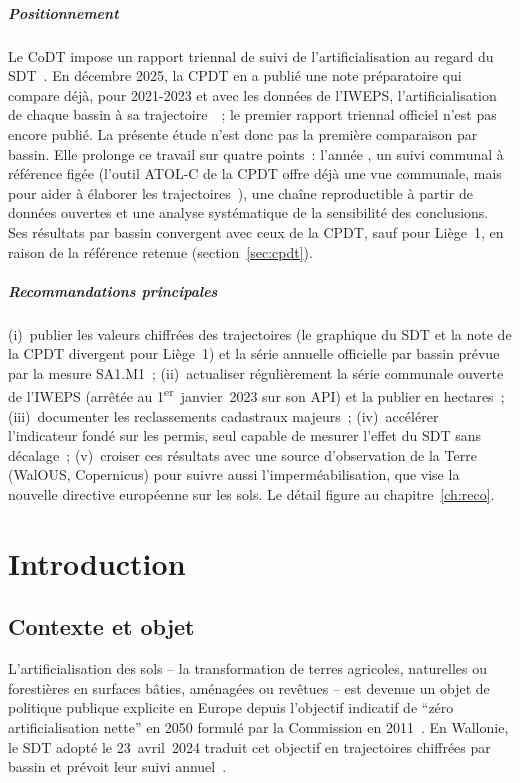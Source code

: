 \documentclass[11pt,a4paper]{report}
\begin{document}
\paragraph{Positionnement} Le CoDT impose un rapport triennal de suivi de l'artificialisation au regard du SDT~\citep{codt}. En décembre 2025, la CPDT en a publié une note préparatoire qui compare déjà, pour 2021-2023 et avec les données de l'IWEPS, l'artificialisation de chaque bassin à sa trajectoire~\citep{cpdt_prep2025,cpdt_monitoring2025}~; le premier rapport triennal officiel n'est pas encore publié. La présente étude n'est donc pas la première comparaison par bassin. Elle prolonge ce travail sur quatre points~: l'année \AnneeFinObs, un suivi communal à référence figée (l'outil ATOL-C de la CPDT offre déjà une vue communale, mais pour aider à élaborer les trajectoires~\citep{atolc2025}), une chaîne reproductible à partir de données ouvertes et une analyse systématique de la sensibilité des conclusions. Ses résultats par bassin convergent avec ceux de la CPDT, sauf pour Liège~1, en raison de la référence retenue (section~\ref{sec:cpdt}).

\paragraph{Recommandations principales} (i)~publier les valeurs chiffrées des trajectoires (le graphique du SDT et la note de la CPDT divergent pour Liège~1) et la série annuelle officielle par bassin prévue par la mesure SA1.M1~; (ii)~actualiser régulièrement la série communale ouverte de l'IWEPS (arrêtée au 1\textsuperscript{er}~janvier~2023 sur son API) et la publier en hectares~; (iii)~documenter les reclassements cadastraux majeurs~; (iv)~accélérer l'indicateur fondé sur les permis, seul capable de mesurer l'effet du SDT sans décalage~; (v)~croiser ces résultats avec une source d'observation de la Terre (WalOUS, Copernicus) pour suivre aussi l'imperméabilisation, que vise la nouvelle directive européenne sur les sols. Le détail figure au chapitre~\ref{ch:reco}.

\chapter{Introduction}
\label{ch:intro}

\section{Contexte et objet}
L'artificialisation des sols -- la transformation de terres agricoles, naturelles ou forestières en surfaces bâties, aménagées ou revêtues -- est devenue un objet de politique publique explicite en Europe depuis l'objectif indicatif de \enquote{zéro artificialisation nette} en 2050 formulé par la Commission en 2011~\citep{ce2011,ce2021}. En Wallonie, le SDT adopté le 23~avril~2024 traduit cet objectif en trajectoires chiffrées par bassin et prévoit leur suivi annuel~\citep{sdt2024}.
\end{document}

